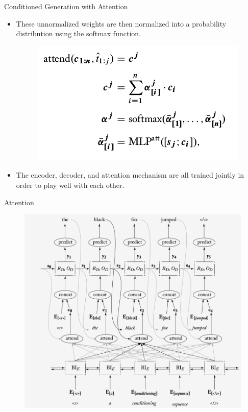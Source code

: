 \documentclass[handout]{beamer}
\begin{document}
\begin{frame}{Conditioned Generation with Attention}
\begin{scriptsize}
\begin{itemize}
\item These unnormalized weights are then normalized into a probability distribution using the softmax function.

\begin{figure}[h]
        	\includegraphics[scale = 0.35]{pics/atten_formula.png}
        \end{figure}  

        
                

\item The encoder, decoder, and attention mechanism are all trained jointly in order to play well with each other.


\end{itemize}
\end{scriptsize}
\end{frame}





\begin{frame}{Attention}
         \begin{figure}[h]
        	\includegraphics[scale = 0.35]{pics/encdecattention.png}
        \end{figure}  
\end{frame}
\end{document}
